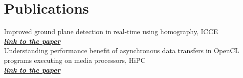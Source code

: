 \documentclass[]{deedy-resume-openfont}
\begin{document}
\begin{minipage}[t]{0.36\textwidth}

\section{Publications}
    \textbullet{} Improved ground plane detection in real-time using homography, ICCE \\
    \href{https://ieeexplore.ieee.org/document/6775971} {\bf \textit{link to the paper}} \\
    \textbullet{} Understanding performance benefit of asynchronous data transfers in OpenCL programs executing on media processors, HiPC \\
    \href{https://ieeexplore.ieee.org/document/7397627} {\bf \textit{link to the paper}} \\

\end{minipage}





\end{document}

